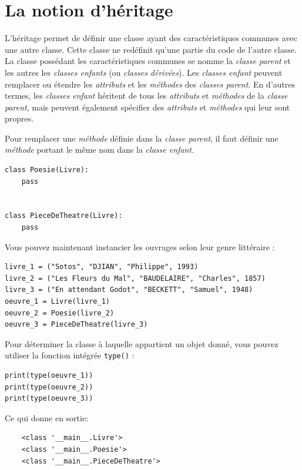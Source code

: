 \documentclass[a4paper,11pt]{book}
\begin{document}
\chapter{La notion d'héritage}
L'héritage permet de définir une classe ayant des caractéristiques communes avec une autre classe. Cette classe ne redéfinit qu'une partie du code de l'autre classe. La classe possédant les caractéristiques communes se nomme la \textit{classe parent} et les autres les \textit{classes enfants} (ou \textit{classes dérivées}). Les \textit{classes enfant} peuvent remplacer ou étendre les \textit{attributs} et les \textit{méthodes} des \textit{classes parent}. En d'autres termes, les \textit{classes enfant} héritent de tous les \textit{attributs} et \textit{méthodes} de la  \textit{classe parent}, mais peuvent également spécifier des \textit{attributs} et \textit{méthodes} qui leur sont propres.
\medskip

Pour remplacer une \textit{méthode} définie dans la \textit{classe parent}, il faut définir une \textit{méthode} portant le même nom dans la \textit{classe enfant}.
\begin{lstlisting}[caption=Définir deux textit{classes enfant}]
class Poesie(Livre):
    pass


class PieceDeTheatre(Livre):
    pass
\end{lstlisting}
\medskip

Vous pouvez maintenant instancier les ouvrages selon leur genre littéraire :
\begin{lstlisting}[caption=Les instanciations]
livre_1 = ("Sotos", "DJIAN", "Philippe", 1993)
livre_2 = ("Les Fleurs du Mal", "BAUDELAIRE", "Charles", 1857)
livre_3 = ("En attendant Godot", "BECKETT", "Samuel", 1948)
oeuvre_1 = Livre(livre_1)
oeuvre_2 = Poesie(livre_2)
oeuvre_3 = PieceDeTheatre(livre_3)
\end{lstlisting}
\medskip

Pour déterminer la classe à laquelle appartient un objet donné, vous pouvez utiliser la fonction intégrée \texttt{type()} :
\begin{lstlisting}[caption=La fonction \texttt{type()}]
print(type(oeuvre_1))
print(type(oeuvre_2))
print(type(oeuvre_3))
\end{lstlisting}
\medskip

Ce qui donne en sortie:
\begin{verbatim}
    <class '__main__.Livre'>
    <class '__main__.Poesie'>
    <class '__main__.PieceDeTheatre'>
\end{verbatim}
\medskip	
\end{document}
